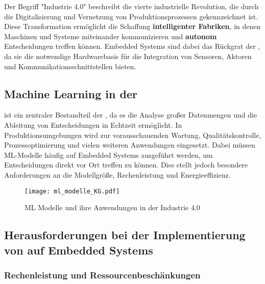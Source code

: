 Der Begriff "Industrie 4.0" beschreibt die vierte industrielle Revolution, die durch die Digitalisierung und Vernetzung 
von Produktionsprozessen gekennzeichnet ist. Diese Transformation ermöglicht die Schaffung \textbf{intelligenter Fabriken}, 
in denen Maschinen und Systeme miteinander kommunizieren und \textbf{autonom} Entscheidungen treffen können. Embedded Systems 
sind dabei das Rückgrat der \Iviernull, da sie die notwendige Hardwarebasis für die Integration von Sensoren, 
Aktoren und Kommunikationsschnittstellen bieten.

\subsection{Machine Learning in der \Iviernull}

\ML ist ein zentraler Bestandteil der \Iviernull, da es die Analyse großer Datenmengen und die Ableitung 
von Entscheidungen in Echtzeit ermöglicht. In Produktionsumgebungen wird \ML zur vorausschauenden Wartung, 
Qualitätskontrolle, Prozessoptimierung \cite{telecom4010011} und vielen weiteren Anwendungen eingesetzt. Dabei müssen ML-Modelle häufig auf 
Embedded Systems ausgeführt werden, um Entscheidungen direkt vor Ort treffen zu können. Dies stellt jedoch besondere Anforderungen 
an die Modellgröße, Rechenleistung und Energieeffizienz.
\begin{figure}[h]
    \centering
    \texttt{[image: ml\_modelle\_KG.pdf]}
    \caption{ML Modelle und ihre Anwendungen in der Industrie 4.0}
    \label{fig:ml_modelle_KG}
\end{figure}

\subsection{Herausforderungen bei der Implementierung von \ML auf Embedded Systems}
\subsubsection{Rechenleistung und Ressourcenbeschänkungen}

